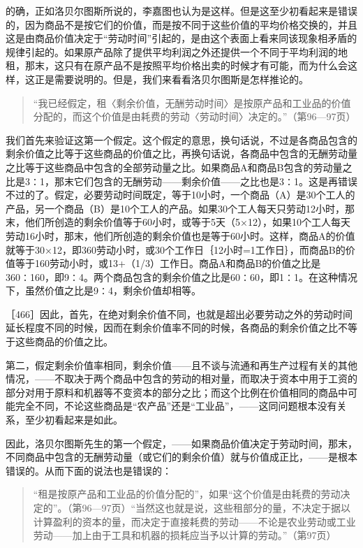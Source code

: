 的确，正如洛贝尔图斯所说的，李嘉图也认为是这样。但是这至少初看起来是错误的，因为商品不是按它们的价值，而是按不同于这些价值的平均价格交换的，并且这是由商品价值决定于“劳动时间”引起的，是由这个表面上看来同该现象相矛盾的规律引起的。如果原产品除了提供平均利润之外还提供一个不同于平均利润的地租，那末，这只有在原产品不是按照平均价格出卖的时候才有可能，而为什么会这样，这正是需要说明的。但是，我们来看看洛贝尔图斯是怎样推论的。

\begin{quote}{“我已经假定，租〈剩余价值，无酬劳动时间〉是按原产品和工业品的价值分配的，而这个价值是由耗费的劳动〈劳动时间〉决定的。”（第96—97页）}\end{quote}

我们首先来验证这第一个假定。这个假定的意思，换句话说，不过是各商品包含的剩余价值之比等于这些商品的价值之比，再换句话说，各商品中包含的无酬劳动量之比等于这些商品中包含的全部劳动量之比。如果商品A和商品B包含的劳动量之比是3∶1，那末它们包含的无酬劳动——剩余价值——之比也是3∶1。这是再错误不过的了。假定，必要劳动时间既定，等于10小时，一个商品（A）是30个工人的产品，另一个商品（B）是10个工人的产品。如果30个工人每天只劳动12小时，那末，他们所创造的剩余价值等于60小时，或等于5天（5×12），如果10个工人每天劳动16小时，那末，他们所创造的剩余价值也是等于60小时。这样，商品A的价值就等于30×12，即360劳动小时，或30个工作日｛12小时=1工作日｝，而商品B的价值等于160劳动小时，或13+（1/3）工作日。商品A和商品B的价值之比是360∶160，即9∶4。两个商品包含的剩余价值之比是60∶60，即1∶1。在这种情况下，虽然价值之比是9∶4，剩余价值却相等。

［466］因此，首先，在绝对剩余价值不同，也就是超出必要劳动之外的劳动时间延长程度不同的时候，因而在剩余价值率不同的时候，各商品的剩余价值之比不等于这些商品的价值之比。

第二，假定剩余价值率相同，剩余价值——且不谈与流通和再生产过程有关的其他情况，——不取决于两个商品中包含的劳动的相对量，而取决于资本中用于工资的部分对用于原料和机器等不变资本的部分之比；而这个比例在价值相同的商品中可能完全不同，不论这些商品是“农产品”还是“工业品”，——这同问题根本没有关系，至少初看起来是如此。

因此，洛贝尔图斯先生的第一个假定，——如果商品价值决定于劳动时间，那末，不同商品中包含的无酬劳动量（或它们的剩余价值）就与价值成正比，——是根本错误的。从而下面的说法也是错误的：

\begin{quote}{“租是按原产品和工业品的价值分配的”，如果“这个价值是由耗费的劳动决定的”。（第96—97页）“当然这也就是说，这些租部分的量，不决定于据以计算盈利的资本的量，而决定于直接耗费的劳动——不论是农业劳动或工业劳动——加上由于工具和机器的损耗应当予以计算的劳动。”（第97页）}\end{quote}


